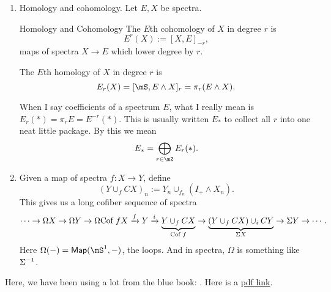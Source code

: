 \begin{enumerate}
    Consider the map $f:\mS\to \mS$ which is a degree 2 map, so we have maps $S^{n+2}\to S^n$. Note that $S^2\to S^0$ is nullhomotopic. $S^3\to S^1$ is nullhomotopic. However, $S^4\to S^2$ is not nullhomotopic and can be represented by $\eta^2$ (look up the Hopf map! There are several cool links if you ask one of us about them). 

    Here is yet another construction!
    \begin{definition}{Maps between spectra, version 3}{}
        A map of spectra $f:E\to F$ of degree $r$ is a homotopy class of functions of spectra $f:E\to F$ of degree $r$ where the function is defined ``in the limit.'' Find the maps between high enough $E_N$, and worry about the early ones later on. Scotty heard from his advisor that this philosophy is ``cells now, maps later.''
    \end{definition}
     When we talk about maps from spectra to spectra of degree $r$, we denote the collection of homotopy classes of maps of degree $r$ between the two spectra as $$[E,F]_r.$$
    \item Homology and cohomology. Let $E,X$ be spectra. 
    
    \begin{definition}{Homology and Cohomology}{}
        The $E$th cohomology of $X$ in degree $r$ is $$E^r(X):=[X,E]_{-r},$$ maps of spectra $X\to E$ which lower degree by $r$. 
    
        The $E$th homology of $X$ in degree $r$ is $$E_r(X)=[\mS,E\wedge X]_r = \pi_r(E\wedge X).$$
    \end{definition}
    When I say coefficients of a spectrum $E$, what I really mean is $E_r(\ast) = \pi_r E = E^{-r}(\ast)$. This is usually written $E_\ast$ to collect all $r$ into one neat little package. By this we mean $$E_\ast = \bigoplus_{r\in \mZ} E_r(\ast).$$
    \item Given a map of spectra $f:X\to Y$, define $$(Y\cup_f CX)_n:=Y_n\cup_{f_n}(I_+\wedge X_n).$$ This gives us a long cofiber sequence of spectra $$\cdots\to\Omega X\to \Omega Y\to\Omega \text{Cof } fX\xrightarrow{f}Y\xrightarrow{i}\underbrace{Y\cup_f CX}_{\text{Cof }f}\to \underbrace{(Y\cup_f CX)\cup_i CY}_{\Sigma X}\to \Sigma Y\to \cdots.$$ Here $\Omega(-) = \mathsf{Map}(\mS^1,-)$, the loops. And in spectra, $\Omega$ is something like $\Sigma^{-1}$. 
\end{enumerate}
Here, we have been using a lot from the blue book: \cite[pg. 123, \S 3]{adams1974stable}. Here is a \href{https://people.math.rochester.edu/faculty/doug/otherpapers/Adams-SHGH.pdf}{pdf link}. 

